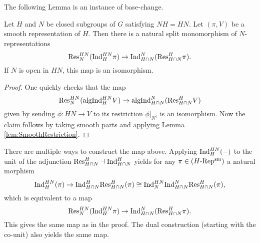 \documentclass[../main.tex]{subfiles}
\begin{document}
The following Lemma is an instance of base-change.
\begin{lem}\label{lem:BaseChangeForResInd}
  Let $H$ and $N$ be closed subgroups of $G$ satisfying $NH = HN$. Let $(\pi,
  V)$ be a smooth representation of $H$.
  Then there is a natural split monomorphism of $N$-representations 
  \begin{equation*}
    \mathrm{Res}_N^{HN} (\mathrm{Ind}_H^{HN} \pi) \to \mathrm{Ind}_{H \cap N}^N(\mathrm{Res}_{H\cap N}^H \pi).
  \end{equation*}
  If $N$ is open in $HN$, this map is an isomorphism.
\begin{proof}
  One quickly checks that the map
  \begin{equation*}
    \mathrm{Res}^{HN}_{N}(\mathrm{algInd}_{H}^{HN} V) \to \mathrm{algInd}_{H\cap N}^{N}(\mathrm{Res}_{H \cap N}^H V)
  \end{equation*}
  given by sending $\phi: HN \to V$ to its restriction $\phi|_N$, is an
  isomorphism. Now the claim follows by taking smooth parts and applying Lemma
  \ref{lem:SmoothRestriction}.
\end{proof}
\end{lem}
\begin{rmk} 
  There are multiple ways to construct the map above.
  Applying $\mathrm{Ind}_H^{HN}(-)$ to the unit of the adjunction $\mathrm{Res}_{H\cap N}^H \dashv
  \mathrm{Ind}_{H\cap N}^H$ yields for any $\pi \in {({H}\text-\allowbreak\mathrm{Rep^{\mathrm{sm}}})}$ a natural morphism
  \begin{equation*}
    \mathrm{Ind}_H^{HN}(\pi) \to \mathrm{Ind}_{H\cap N}^H \mathrm{Res}_{H \cap N}^H (\pi) \cong
    \mathrm{Ind}_{N}^{HN} \mathrm{Ind}_{H \cap N}^N \mathrm{Res}_{H \cap N}^H (\pi),
  \end{equation*}
  which is equivalent to a map 
  \begin{equation*}
    \mathrm{Res}_N^{HN} (\mathrm{Ind}_H^{HN} \pi) \to \mathrm{Ind}_{H \cap N}^N(\mathrm{Res}_{H\cap N}^H \pi).
  \end{equation*}
  This gives the same map as in the proof. The dual construction (starting with the
  co-unit) also yields the same map.
\end{rmk}
\end{document}

